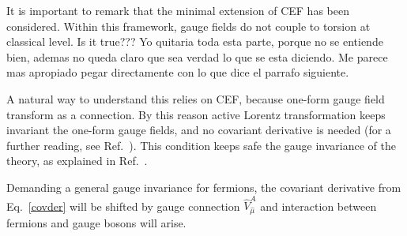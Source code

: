 
It is important to remark that  the minimal extension of CEF has been considered. Within this framework, gauge fields do not couple to torsion at classical level.  {\color{red!50!blue!}\sc Is it true??? Yo quitaria toda esta parte, porque no se entiende bien, ademas no queda claro que sea verdad lo que se esta diciendo. Me parece mas apropiado pegar directamente con lo que dice el parrafo siguiente.}

A  natural way to understand this relies on CEF, because one-form gauge field transform as a connection. By this reason active Lorentz transformation keeps invariant the one-form gauge fields, and no covariant derivative is needed (for a further reading, see Ref.~\cite{Benn:1980ea}). This condition keeps safe the gauge invariance of the theory, as explained in Ref.~\cite[p.407]{Hehl:1976kj}. 

Demanding a general gauge invariance for fermions, the covariant derivative from Eq.~\eqref{covder} will be shifted by gauge connection $\hat{V}_{\hat{\mu}}^A$ and interaction between fermions and gauge bosons will arise.

